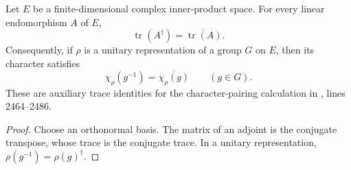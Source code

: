 \begin{lemma}
    \label{thm:peps_unitary_character_adjoint}
    \leanok
    Let $E$ be a finite-dimensional complex inner-product space. For every
    linear endomorphism $A$ of $E$,
    \[
        \operatorname{tr}(A^\dagger)
        =\overline{\operatorname{tr}(A)}.
    \]
    Consequently, if $\rho$ is a unitary representation of a group $G$ on $E$,
    then its character satisfies
    \[
        \chi_\rho(g^{-1})=\overline{\chi_\rho(g)}\qquad(g\in G).
    \]
    These are auxiliary trace identities for the character-pairing calculation
    in \cite[charge-detection proof]{Schuch2010PEPS}, lines 2464--2486.
\end{lemma}
\begin{proof}\leanok
    Choose an orthonormal basis. The matrix of an adjoint is the conjugate
    transpose, whose trace is the conjugate trace. In a unitary representation,
    $\rho(g^{-1})=\rho(g)^\dagger$.
\end{proof}
